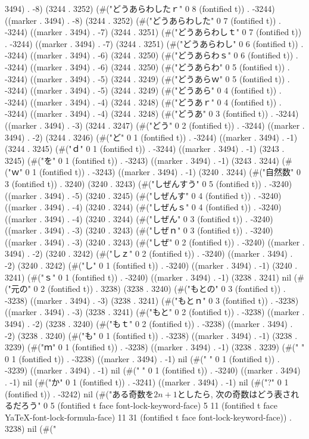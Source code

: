 3494) . -8) (3244 . 3252) (#("どうあらわしたｒ" 0 8 (fontified t)) . -3244) ((marker . 3494) . -8) (3244 . 3252) (#("どうあらわした" 0 7 (fontified t)) . -3244) ((marker . 3494) . -7) (3244 . 3251) (#("どうあらわしｔ" 0 7 (fontified t)) . -3244) ((marker . 3494) . -7) (3244 . 3251) (#("どうあらわし" 0 6 (fontified t)) . -3244) ((marker . 3494) . -6) (3244 . 3250) (#("どうあらわｓ" 0 6 (fontified t)) . -3244) ((marker . 3494) . -6) (3244 . 3250) (#("どうあらわ" 0 5 (fontified t)) . -3244) ((marker . 3494) . -5) (3244 . 3249) (#("どうあらｗ" 0 5 (fontified t)) . -3244) ((marker . 3494) . -5) (3244 . 3249) (#("どうあら" 0 4 (fontified t)) . -3244) ((marker . 3494) . -4) (3244 . 3248) (#("どうあｒ" 0 4 (fontified t)) . -3244) ((marker . 3494) . -4) (3244 . 3248) (#("どうあ" 0 3 (fontified t)) . -3244) ((marker . 3494) . -3) (3244 . 3247) (#("どう" 0 2 (fontified t)) . -3244) ((marker . 3494) . -2) (3244 . 3246) (#("ど" 0 1 (fontified t)) . -3244) ((marker . 3494) . -1) (3244 . 3245) (#("ｄ" 0 1 (fontified t)) . -3244) ((marker . 3494) . -1) (3243 . 3245) (#("を" 0 1 (fontified t)) . -3243) ((marker . 3494) . -1) (3243 . 3244) (#("ｗ" 0 1 (fontified t)) . -3243) ((marker . 3494) . -1) (3240 . 3244) (#("自然数" 0 3 (fontified t)) . 3240) (3240 . 3243) (#("しぜんすう" 0 5 (fontified t)) . -3240) ((marker . 3494) . -5) (3240 . 3245) (#("しぜんす" 0 4 (fontified t)) . -3240) ((marker . 3494) . -4) (3240 . 3244) (#("しぜんｓ" 0 4 (fontified t)) . -3240) ((marker . 3494) . -4) (3240 . 3244) (#("しぜん" 0 3 (fontified t)) . -3240) ((marker . 3494) . -3) (3240 . 3243) (#("しぜｎ" 0 3 (fontified t)) . -3240) ((marker . 3494) . -3) (3240 . 3243) (#("しぜ" 0 2 (fontified t)) . -3240) ((marker . 3494) . -2) (3240 . 3242) (#("しｚ" 0 2 (fontified t)) . -3240) ((marker . 3494) . -2) (3240 . 3242) (#("し" 0 1 (fontified t)) . -3240) ((marker . 3494) . -1) (3240 . 3241) (#("ｓ" 0 1 (fontified t)) . -3240) ((marker . 3494) . -1) (3238 . 3241) nil (#("元の" 0 2 (fontified t)) . 3238) (3238 . 3240) (#("もとの" 0 3 (fontified t)) . -3238) ((marker . 3494) . -3) (3238 . 3241) (#("もとｎ" 0 3 (fontified t)) . -3238) ((marker . 3494) . -3) (3238 . 3241) (#("もと" 0 2 (fontified t)) . -3238) ((marker . 3494) . -2) (3238 . 3240) (#("もｔ" 0 2 (fontified t)) . -3238) ((marker . 3494) . -2) (3238 . 3240) (#("も" 0 1 (fontified t)) . -3238) ((marker . 3494) . -1) (3238 . 3239) (#("ｍ" 0 1 (fontified t)) . -3238) ((marker . 3494) . -1) (3238 . 3239) (#("
" 0 1 (fontified t)) . -3238) ((marker . 3494) . -1) nil (#("	" 0 1 (fontified t)) . -3239) ((marker . 3494) . -1) nil (#(" " 0 1 (fontified t)) . -3240) ((marker . 3494) . -1) nil (#("か" 0 1 (fontified t)) . -3241) ((marker . 3494) . -1) nil (#("?" 0 1 (fontified t)) . -3242) nil (#("ある奇数を$2n+1$としたら, 次の奇数はどう表されるだろう" 0 5 (fontified t face font-lock-keyword-face) 5 11 (fontified t face YaTeX-font-lock-formula-face) 11 31 (fontified t face font-lock-keyword-face)) . 3238) nil (#("

